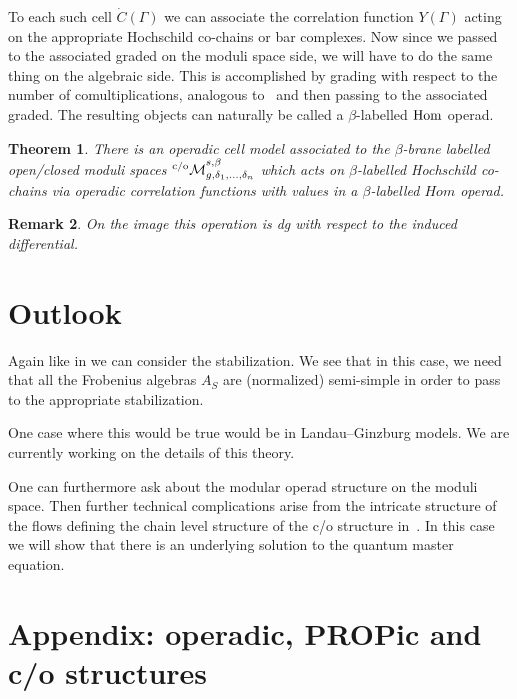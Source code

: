 \documentclass[pdftex]{sigma}
\newtheorem{thm}{Theorem}[section]
\newtheorem{rmk}[thm]{Remark}
\def\Mco{{{}^{\rm c/o}\mathcal M}_{g,\delta_1,\dots,\delta_n}^{s,\beta}}
\begin{document}
To each such cell $\dot C(\Gamma)$ we can associate the correlation function $Y(\Gamma)$ acting
on the approp\-riate Hochschild co-chains or bar complexes. Now
since we passed to the associated graded on the moduli space side, we will have to do the
same thing on the algebraic side. This is accomplished by grading with respect to the number of comultiplications, analogous to~\cite{hoch2} and then passing to the associated graded.
The resulting objects can naturally be called a $\beta$-labelled $\rm Hom$ operad.


\begin{thm}
\label{mainthmtwo}
There is  an operadic cell model
associated to the $\beta$-brane labelled open/closed
moduli spaces $\Mco$ which acts on $\beta$-labelled Hochschild co-chains via operadic correlation functions with values in a $\beta$-labelled $Hom$ operad.
\end{thm}

\begin{rmk}
On the image this operation is dg with respect to the induced dif\/ferential.
\end{rmk}



\section{Outlook}
Again like in \cite{romp,postnikov} we can consider the stabilization. We see that in this
case, we need that all the Frobenius algebras $A_S$ are (normalized) semi-simple in
order to pass to the appropriate stabilization.

One case where this would be true would be in Landau--Ginzburg models.
We are currently working on the details of this theory.

One can furthermore ask about the modular operad structure on the moduli space.
Then further technical complications arise from the intricate structure of the f\/lows def\/ining
the chain level structure of the c/o structure in~\cite{KP}.  In this case we will show
that there is an underlying solution to the quantum master equation.

\appendix

\section{Appendix: operadic, PROPic and c/o structures}\label{appendixA}
\end{document}
